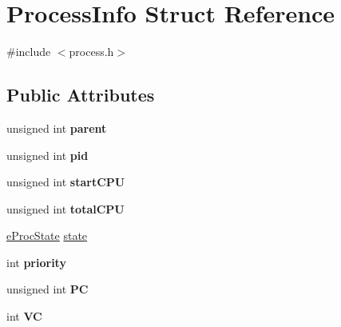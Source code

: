 \hypertarget{structProcessInfo}{\section{\-Process\-Info \-Struct \-Reference}
\label{dd/dc8/structProcessInfo}
}


{\ttfamily \#include $<$process.\-h$>$}

\subsection*{\-Public \-Attributes}
\begin{DoxyCompactItemize}
\item 
\hypertarget{structProcessInfo_a102b9e7e7d958b508cec182bbcaf7d85}{unsigned int {\bfseries parent}}\label{dd/dc8/structProcessInfo_a102b9e7e7d958b508cec182bbcaf7d85}

\item 
\hypertarget{structProcessInfo_ab522cec1e6f7f3b6a7780e6b4611c1f4}{unsigned int {\bfseries pid}}\label{dd/dc8/structProcessInfo_ab522cec1e6f7f3b6a7780e6b4611c1f4}

\item 
\hypertarget{structProcessInfo_ac1e6244dd31274040bdf7ad7ee40db4a}{unsigned int {\bfseries start\-C\-P\-U}}\label{dd/dc8/structProcessInfo_ac1e6244dd31274040bdf7ad7ee40db4a}

\item 
\hypertarget{structProcessInfo_a8a6eda10132e07b1596c09822724b0c7}{unsigned int {\bfseries total\-C\-P\-U}}\label{dd/dc8/structProcessInfo_a8a6eda10132e07b1596c09822724b0c7}

\item 
\hyperlink{process_8h_a2c72cb00af5be695c1f898162350821f}{e\-Proc\-State} \hyperlink{structProcessInfo_a748790bb8c3ef5d2dff552f35b81298e}{state}
\item 
\hypertarget{structProcessInfo_a2f9f55dc3548d0bed66e06db8f47d958}{int {\bfseries priority}}\label{dd/dc8/structProcessInfo_a2f9f55dc3548d0bed66e06db8f47d958}

\item 
\hypertarget{structProcessInfo_a9b2d3f321f21ec1ee97c8dd5e63ac6c8}{unsigned int {\bfseries \-P\-C}}\label{dd/dc8/structProcessInfo_a9b2d3f321f21ec1ee97c8dd5e63ac6c8}

\item 
\hypertarget{structProcessInfo_ab288b59e794cb506663e22c680e05c2d}{int {\bfseries \-V\-C}}\label{dd/dc8/structProcessInfo_ab288b59e794cb506663e22c680e05c2d}


\end{DoxyCompactItemize}
